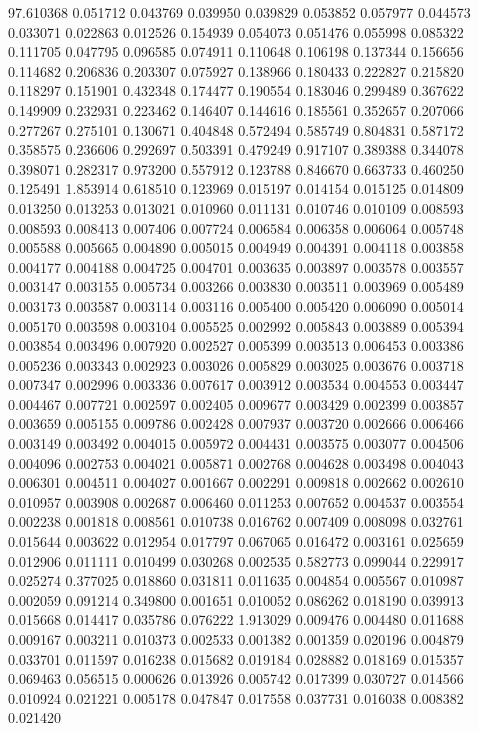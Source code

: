 97.610368
0.051712
0.043769
0.039950
0.039829
0.053852
0.057977
0.044573
0.033071
0.022863
0.012526
0.154939
0.054073
0.051476
0.055998
0.085322
0.111705
0.047795
0.096585
0.074911
0.110648
0.106198
0.137344
0.156656
0.114682
0.206836
0.203307
0.075927
0.138966
0.180433
0.222827
0.215820
0.118297
0.151901
0.432348
0.174477
0.190554
0.183046
0.299489
0.367622
0.149909
0.232931
0.223462
0.146407
0.144616
0.185561
0.352657
0.207066
0.277267
0.275101
0.130671
0.404848
0.572494
0.585749
0.804831
0.587172
0.358575
0.236606
0.292697
0.503391
0.479249
0.917107
0.389388
0.344078
0.398071
0.282317
0.973200
0.557912
0.123788
0.846670
0.663733
0.460250
0.125491
1.853914
0.618510
0.123969
0.015197
0.014154
0.015125
0.014809
0.013250
0.013253
0.013021
0.010960
0.011131
0.010746
0.010109
0.008593
0.008593
0.008413
0.007406
0.007724
0.006584
0.006358
0.006064
0.005748
0.005588
0.005665
0.004890
0.005015
0.004949
0.004391
0.004118
0.003858
0.004177
0.004188
0.004725
0.004701
0.003635
0.003897
0.003578
0.003557
0.003147
0.003155
0.005734
0.003266
0.003830
0.003511
0.003969
0.005489
0.003173
0.003587
0.003114
0.003116
0.005400
0.005420
0.006090
0.005014
0.005170
0.003598
0.003104
0.005525
0.002992
0.005843
0.003889
0.005394
0.003854
0.003496
0.007920
0.002527
0.005399
0.003513
0.006453
0.003386
0.005236
0.003343
0.002923
0.003026
0.005829
0.003025
0.003676
0.003718
0.007347
0.002996
0.003336
0.007617
0.003912
0.003534
0.004553
0.003447
0.004467
0.007721
0.002597
0.002405
0.009677
0.003429
0.002399
0.003857
0.003659
0.005155
0.009786
0.002428
0.007937
0.003720
0.002666
0.006466
0.003149
0.003492
0.004015
0.005972
0.004431
0.003575
0.003077
0.004506
0.004096
0.002753
0.004021
0.005871
0.002768
0.004628
0.003498
0.004043
0.006301
0.004511
0.004027
0.001667
0.002291
0.009818
0.002662
0.002610
0.010957
0.003908
0.002687
0.006460
0.011253
0.007652
0.004537
0.003554
0.002238
0.001818
0.008561
0.010738
0.016762
0.007409
0.008098
0.032761
0.015644
0.003622
0.012954
0.017797
0.067065
0.016472
0.003161
0.025659
0.012906
0.011111
0.010499
0.030268
0.002535
0.582773
0.099044
0.229917
0.025274
0.377025
0.018860
0.031811
0.011635
0.004854
0.005567
0.010987
0.002059
0.091214
0.349800
0.001651
0.010052
0.086262
0.018190
0.039913
0.015668
0.014417
0.035786
0.076222
1.913029
0.009476
0.004480
0.011688
0.009167
0.003211
0.010373
0.002533
0.001382
0.001359
0.020196
0.004879
0.033701
0.011597
0.016238
0.015682
0.019184
0.028882
0.018169
0.015357
0.069463
0.056515
0.000626
0.013926
0.005742
0.017399
0.030727
0.014566
0.010924
0.021221
0.005178
0.047847
0.017558
0.037731
0.016038
0.008382
0.021420
